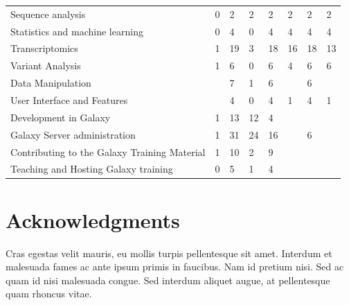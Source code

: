 \documentclass[10pt,letterpaper]{article}
\begin{document}
\begin{table}[]
\begin{adjustwidth}{-2.25in}{0in}
\begin{tabular}{p{2in}|p{0.8in}llp{0.8in}lll}
		Sequence analysis                            & 0                        & 2         & 2           & 2                  & 2         & 2              & 2\\
		Statistics and machine learning              & 0                        & 4         & 0           & 4                  & 4         & 4              & 4\\
		Transcriptomics                              & 1                        & 19        & 3           & 18                 & 16        & 18             & 13\\
		Variant Analysis                             & 1                        & 6         & 0           & 6                  & 4         & 6              & 6\\
		Data Manipulation                            &                          & 7         & 1           & 6                  &           & 6              & \\
		User Interface and Features                  &                          & 4         & 0           & 4                  & 1         & 4              & 1\\
		Development in Galaxy                        & 1                        & 13        & 12          & 4                  &           &                & \\
		Galaxy Server administration                 & 1                        & 31        & 24          & 16                 &           & 6              & \\
		Contributing to the Galaxy Training Material & 1                        & 10        & 2           & 9                  &           &                & \\
		Teaching and Hosting Galaxy training         & 0                        & 5         & 1           & 4                  &           &                & \\
	\end{tabular}
\end{adjustwidth}
\end{table}


\section*{Acknowledgments}
Cras egestas velit mauris, eu mollis turpis pellentesque sit amet. Interdum et malesuada fames ac ante ipsum primis in faucibus. Nam id pretium nisi. Sed ac quam id nisi malesuada congue. Sed interdum aliquet augue, at pellentesque quam rhoncus vitae.
\end{document}
